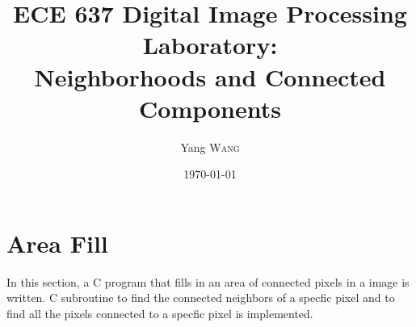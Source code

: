 \documentclass{article}
\title{ECE 637 Digital Image Processing Laboratory: \\ Neighborhoods and Connected Components} %
\author{Yang \textsc{Wang}} %
\date{\today} %
\begin{document}
\maketitle %





\section{Area Fill}
	In this section, a C program that fills in an area of connected pixels in a
	image is written. C subroutine to find the connected neighbors of a specfic
	pixel and to find all the pixels connected to a specfic pixel is implemented.
\end{document}
